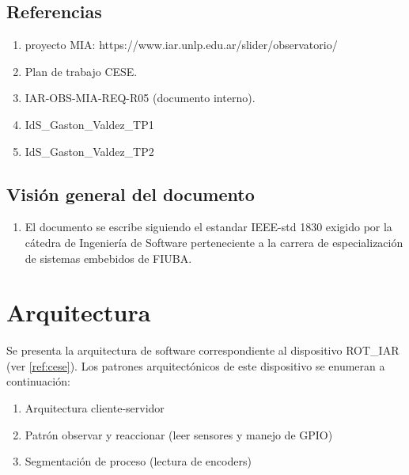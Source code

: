 \documentclass[12pt,a4paper, twosite]{article}
\begin{document}
	\subsection{Referencias}
	\label{sec:org62711e0}
	\begin{enumerate}
		\item  \label{ref:MIA}proyecto MIA: https://www.iar.unlp.edu.ar/slider/observatorio/
		\item \label{ref:cese} Plan de trabajo CESE.
		\item \label{ref:ptr} IAR-OBS-MIA-REQ-R05 (documento interno).
		\item \label{ref:ids_1} IdS\_Gaston\_Valdez\_TP1 
		\item \label{ref:ids_2} IdS\_Gaston\_Valdez\_TP2 
		
	\end{enumerate}
	
	\subsection{Visión general del documento}
	\label{sec:orgdaca22c}
	\begin{enumerate}
		
		
	\item El documento se escribe siguiendo el estandar IEEE-std 1830 exigido por la cátedra de Ingeniería de Software perteneciente a la carrera de especialización de sistemas embebidos de FIUBA. 
	\end{enumerate}
	
	\section{Arquitectura}
	\label{sec:orgc1c4017}
	Se presenta la arquitectura de software correspondiente al dispositivo ROT\_IAR (ver \ref{ref:cese}). Los patrones arquitectónicos de este dispositivo se enumeran a continuación:  
	\begin{enumerate}
		\item Arquitectura cliente-servidor  
		\item Patrón observar y reaccionar (leer sensores y manejo de GPIO)
		\item Segmentación de proceso (lectura de encoders) 
	\end{enumerate}
	
\end{document}
